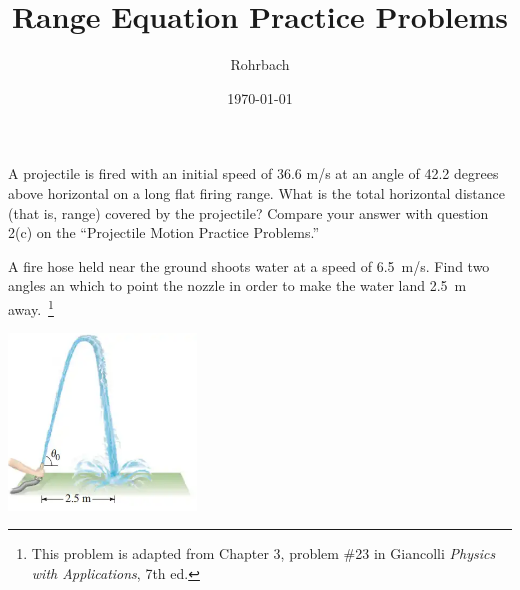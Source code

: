 \documentclass[10pt]{exam}
\title{Range Equation Practice Problems}
\author{Rohrbach}
\date{\today}
\begin{document}
\maketitle

\begin{questions}

  \question
    A projectile is fired with an initial speed of 36.6 m/s at an angle of 42.2 degrees above horizontal on a long flat firing range.  What is the total horizontal distance (that is, range) covered by the projectile?  Compare your answer with question 2(c) on the ``Projectile Motion Practice Problems.''  

    \vs

  \question
    A fire hose held near the ground shoots water at a speed of 6.5~m/s.  Find two angles an which to point the nozzle in order to make the water land 2.5~m away.~\footnote{This problem is adapted from Chapter 3, problem \#23 in Giancolli \textit{Physics with Applications}, 7th ed.}

    \includegraphics[width=5cm]{hose}

  \vs


  
\end{questions}
\end{document}
